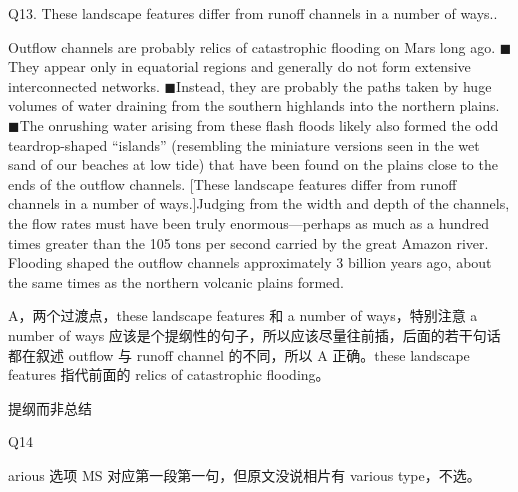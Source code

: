 \begin{blk}
    \begin{qst}
        Q13. These landscape features differ from runoff channels in a number of ways..
    \end{qst}

    \begin{psgq}
        Outflow channels are probably relics of catastrophic flooding on Mars long ago. $\blacksquare$They appear only in equatorial regions and generally do not form extensive interconnected networks. $\blacksquare$Instead, they are probably the paths taken by huge volumes of water draining from the southern highlands into the northern plains. $\blacksquare$The onrushing water arising from these flash floods likely also formed the odd teardrop-shaped “islands” (resembling the miniature versions seen in the wet sand of our beaches at low tide) that have been found on the plains close to the ends of the outflow channels. [These landscape features differ from runoff channels in a number of ways.]Judging from the width and depth of the channels, the flow rates must have been truly enormous—perhaps as much as a hundred times greater than the 105 tons per second carried by the great Amazon river. Flooding shaped the outflow channels approximately 3 billion years ago, about the same times as the northern volcanic plains formed.
    \end{psgq}

    \begin{nlz}
        A，两个过渡点，these landscape features 和 a number of ways，特别注意 a number of ways 应该是个提纲性的句子，所以应该尽量往前插，后面的若干句话都在叙述 outflow 与 runoff channel 的不同，所以 A 正确。these landscape features 指代前面的 relics of catastrophic flooding。

        提纲而非总结
    \end{nlz}
\end{blk}


\begin{blk}
    \begin{qst}
        Q14
    \end{qst}

    \begin{nlz}
        arious 选项 MS 对应第一段第一句，但原文没说相片有 various type，不选。
    \end{nlz}
\end{blk}
